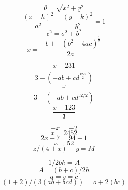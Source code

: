\documentclass{article}
\begin{document}
\[ \theta = \sqrt{x^2 + y^2} \]
\[ \frac{(x-h)^2}{a^2} - \frac{(y-k)^2}{b^2} = 1\]
\[ c^2 = a^2 + b^2 \]
\[ x = \frac{-b+-(b^2-4ac)^{\frac{1}{2}}}{2a} \]

\[ \frac{x+231}{3-(-ab + cd^\frac{3222}{2})} \]
\[ \frac{x}{3-(-ab + cd^{32/2})} \]
\[ \frac{x+123}{3} \]

\[ -x = -2 \]
\[ x=2452 \] 
\[ 2x + 7 = 94 - 1 \] 
\[ x = 52 \] 
\[ z/(4 + x) - y = M \]

\[ 1/2bh = A \]
\[ A = (b+c)/2h \]
\[ a=b=c \]
\[ (1+2)/(3(ab+5cd))=a+2(bc) \]
\end{document}
